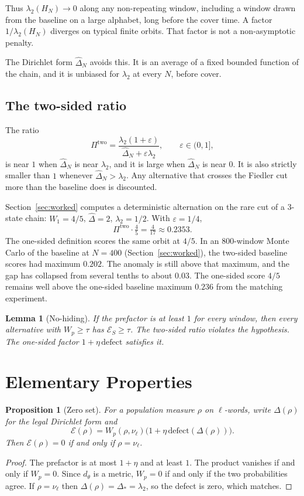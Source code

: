 \documentclass[11pt,reqno]{amsart}
\newtheorem{lemma}[theorem]{Lemma}
\newtheorem{proposition}[theorem]{Proposition}
\theoremstyle{remark}
\newcommand{\ES}{\mathcal{E}_S}
\newcommand{\two}{\mathrm{two}}
\newcommand{\defect}{\mathrm{defect}}
\begin{document}
Thus $\lambda_2(H_N) \to 0$ along any non-repeating window, including a window drawn from the baseline on a large alphabet, long before the cover time. A factor $1/\lambda_2(H_N)$ diverges on typical finite orbits. That factor is not a non-asymptotic penalty.

The Dirichlet form $\hat\Delta_N$ avoids this. It is an average of a fixed bounded function of the chain, and it is unbiased for $\lambda_2$ at every $N$, before cover.

\subsection{The two-sided ratio}\label{subsec:two-sided}

The ratio
\[
\Pi^{\two} = \frac{\lambda_2(1+\varepsilon)}{\hat\Delta_N + \varepsilon\lambda_2}, \qquad \varepsilon \in (0,1],
\]
is near $1$ when $\hat\Delta_N$ is near $\lambda_2$, and it is large when $\hat\Delta_N$ is near $0$. It is also strictly smaller than $1$ whenever $\hat\Delta_N > \lambda_2$. Any alternative that crosses the Fiedler cut more than the baseline does is discounted.

Section~\ref{sec:worked} computes a deterministic alternation on the rare cut of a $3$-state chain: $W_1 = 4/5$, $\hat\Delta = 2$, $\lambda_2 = 1/2$. With $\varepsilon = 1/4$,
\[
\Pi^{\two} \cdot \tfrac45 = \tfrac{4}{17} \approx 0.2353.
\]
The one-sided definition scores the same orbit at $4/5$. In an $800$-window Monte Carlo of the baseline at $N = 400$ (Section~\ref{sec:worked}), the two-sided baseline scores had maximum $0.202$. The anomaly is still above that maximum, and the gap has collapsed from several tenths to about $0.03$. The one-sided score $4/5$ remains well above the one-sided baseline maximum $0.236$ from the matching experiment.

\begin{lemma}[No-hiding]
If the prefactor is at least $1$ for every window, then every alternative with $W_p \ge \tau$ has $\ES \ge \tau$. The two-sided ratio violates the hypothesis. The one-sided factor $1+\eta\,\defect$ satisfies it.
\end{lemma}

\section{Elementary Properties}\label{sec:elementary}

\begin{proposition}[Zero set]\label{prop:zero}
For a population measure $\rho$ on $\ell$-words, write $\Delta(\rho)$ for the legal Dirichlet form and
\[
\mathcal{E}(\rho) = W_p(\rho, \nu_\ell)\bigl(1+\eta\,\defect(\Delta(\rho))\bigr).
\]
Then $\mathcal{E}(\rho) = 0$ if and only if $\rho = \nu_\ell$.
\end{proposition}
\begin{proof}
The prefactor is at most $1+\eta$ and at least $1$. The product vanishes if and only if $W_p = 0$. Since $d_\theta$ is a metric, $W_p = 0$ if and only if the two probabilities agree. If $\rho = \nu_\ell$ then $\Delta(\rho) = \Delta_* = \lambda_2$, so the defect is zero, which matches.
\end{proof}
\end{document}

